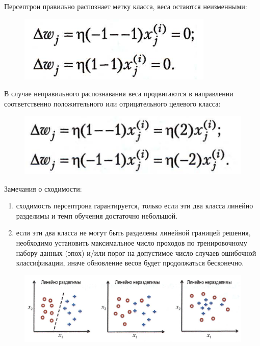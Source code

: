 \documentclass{beamer}
\begin{document}
\begin{frame}[t]
	Персептрон правильно распознает метку класса, веса остаются неизменными:
	\begin{figure}[h]
		\centering
		\includegraphics[scale=0.5]{images/lec03-pic06.png}
	\end{figure}
	В случае неправильного распознавания веса продвигаются в направлении соответственно 	положительного или отрицательного целевого класса:
	\begin{figure}[h]
		\centering
		\includegraphics[scale=0.5]{images/lec03-pic07.png}
	\end{figure}
\end{frame}

\begin{frame}[t]
	\linespread{1.0}
	Замечания о сходимости:
	\begin{enumerate}
		\item сходимость персептрона гарантируется, только если эти два класса линейно разделимы и темп обучения достаточно небольшой. 
		\item если эти два класса не могут быть разделены линейной границей решения, необходимо установить максимальное число проходов по тренировочному набору данных (эпох) и/или порог на допустимое число случаев ошибочной классификации, иначе обновление весов будет продолжаться бесконечно.
	\end{enumerate}
	\begin{figure}[h]
		\centering
		\includegraphics[scale=0.35]{images/lec03-pic08.png}
	\end{figure}
\end{frame}
\end{document}

